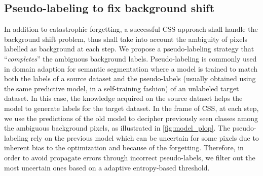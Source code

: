 \subsection{Pseudo-labeling to fix background shift}\label{sec:hardpl}

In addition to catastrophic forgetting, a successful CSS approach shall handle the background shift
problem, thus shall take into account the ambiguity of pixels labelled as background at each step.
We propose a pseudo-labeling strategy that ``\textit{completes}'' the ambiguous background labels.
Pseudo-labeling \citep{lee2013pseudolabel} is commonly used in domain adaption for semantic
segmentation
\citep{vu2019advent,li2019bidirectionallearning,zou2018classbalancedselftraining,saporta2020esl}
where a model is trained to match both the labels of a source dataset and the pseudo-labels (usually
obtained using the same predictive model, in a self-training fashion) of an unlabeled target
dataset. In this case, the knowledge acquired on the source dataset helps the model to generate
labels for the target dataset. In the frame of CSS, at each step, we use the predictions of the old
model to decipher previously seen classes among the ambiguous background pixels, as illustrated in
\autoref{fig:model_plop}. The pseudo-labeling rely on the previous model which can be uncertain for
some pixels due to inherent bias to the optimization and because of the forgetting. Therefore, in
order to avoid propagate errors through incorrect pseudo-labels, we filter out the most uncertain
ones based on a adaptive entropy-based threshold.

